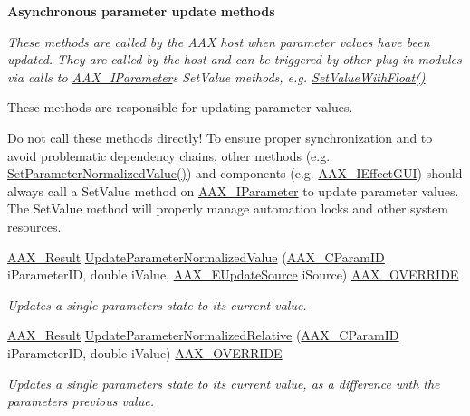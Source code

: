 \begin{Indent}\textbf{ Asynchronous parameter update methods}\par
{\em These methods are called by the A\+AX host when parameter values have been updated. They are called by the host and can be triggered by other plug-\/in modules via calls to \mbox{\hyperlink{a01857}{A\+A\+X\+\_\+\+I\+Parameter}}\textquotesingle{}s {\ttfamily Set\+Value} methods, e.\+g. \mbox{\hyperlink{a01857_a1d37b80bc3a9c4e53fc2c1684f47dfb7}{Set\+Value\+With\+Float()}}

These methods are responsible for updating parameter values.

Do not call these methods directly! To ensure proper synchronization and to avoid problematic dependency chains, other methods (e.\+g. \mbox{\hyperlink{a01481_a8eabaa279c51e74b30d3d2ffa5c865cb}{Set\+Parameter\+Normalized\+Value()}}) and components (e.\+g. \mbox{\hyperlink{a01821}{A\+A\+X\+\_\+\+I\+Effect\+G\+UI}}) should always call a {\ttfamily Set\+Value} method on \mbox{\hyperlink{a01857}{A\+A\+X\+\_\+\+I\+Parameter}} to update parameter values. The {\ttfamily Set\+Value} method will properly manage automation locks and other system resources. }\begin{DoxyCompactItemize}
\item 
\mbox{\hyperlink{a00392_a4d8f69a697df7f70c3a8e9b8ee130d2f}{A\+A\+X\+\_\+\+Result}} \mbox{\hyperlink{a01481_aeff79c1e5cc6b65c7ed21d9912f87caf}{Update\+Parameter\+Normalized\+Value}} (\mbox{\hyperlink{a00392_a1440c756fe5cb158b78193b2fc1780d1}{A\+A\+X\+\_\+\+C\+Param\+ID}} i\+Parameter\+ID, double i\+Value, \mbox{\hyperlink{a00491_a30be0398faf20c6b121239eb9399f3f7}{A\+A\+X\+\_\+\+E\+Update\+Source}} i\+Source) \mbox{\hyperlink{a00392_ac2f24a5172689ae684344abdcce55463}{A\+A\+X\+\_\+\+O\+V\+E\+R\+R\+I\+DE}}
\begin{DoxyCompactList}\small\item\em Updates a single parameter\textquotesingle{}s state to its current value. \end{DoxyCompactList}\item 
\mbox{\hyperlink{a00392_a4d8f69a697df7f70c3a8e9b8ee130d2f}{A\+A\+X\+\_\+\+Result}} \mbox{\hyperlink{a01481_aa2e14fdf26352f16f3b0c437bc0894cb}{Update\+Parameter\+Normalized\+Relative}} (\mbox{\hyperlink{a00392_a1440c756fe5cb158b78193b2fc1780d1}{A\+A\+X\+\_\+\+C\+Param\+ID}} i\+Parameter\+ID, double i\+Value) \mbox{\hyperlink{a00392_ac2f24a5172689ae684344abdcce55463}{A\+A\+X\+\_\+\+O\+V\+E\+R\+R\+I\+DE}}
\begin{DoxyCompactList}\small\item\em Updates a single parameter\textquotesingle{}s state to its current value, as a difference with the parameter\textquotesingle{}s previous value. \end{DoxyCompactList}\item 

\end{DoxyCompactItemize}
\end{Indent}

